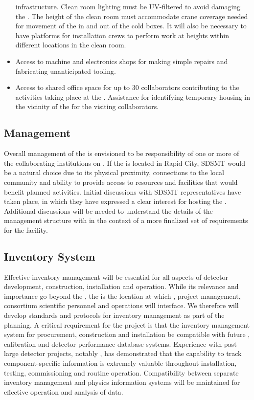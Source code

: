 \begin{itemize}
    infrastructure.  Clean room lighting must be UV-filtered to avoid
    damaging the .  The height of the clean room must
    accommodate crane coverage needed for movement of the  in and
    out of the cold boxes.  It will also be necessary to have
    platforms for installation crews to perform work at heights within
    different locations in the clean room.
  \item Access to machine and electronics shops for making simple
    repairs and fabricating unanticipated tooling.
  \item Access to shared office space for up to \num{30} collaborators
    contributing to the activities taking place at the .
    Assistance for identifying temporary housing in the vicinity of
    the  for the visiting collaborators.
\end{itemize}

\subsection{Management}

Overall management of the  is envisioned to be
responsibility of one or more of the collaborating institutions on
.  If the  is located in Rapid City, SDSMT
would be a natural choice due to its physical proximity, connections
to the local community and ability to provide access to resources and
facilities that would benefit planned  activities.  Initial
discussions with SDSMT representatives have taken place, in which
they have expressed a clear interest for hosting the .
Additional discussions will be needed to understand the details of the
 management structure with in the context of a more
finalized set of requirements for the facility.

\subsection{Inventory System}

Effective inventory management will be essential for all aspects of
 detector development, construction, installation and
operation.  While its relevance and importance go beyond the
, the  is the location at
which ,  project management, consortium
scientific personnel and \surf operations will interface.  We therefore
will develop standards and protocols for inventory management as part
of the  planning.  A critical requirement for the project
is that the inventory management system for procurement, construction
and installation be compatible with future , calibration and
detector performance database systems.  Experience with past large
detector projects, notably \nova, has demonstrated that the capability
to track component-specific information is extremely valuable
throughout installation, testing, commissioning and routine operation.
Compatibility between separate inventory management and physics
information systems will be maintained for effective operation and
analysis of  data.

